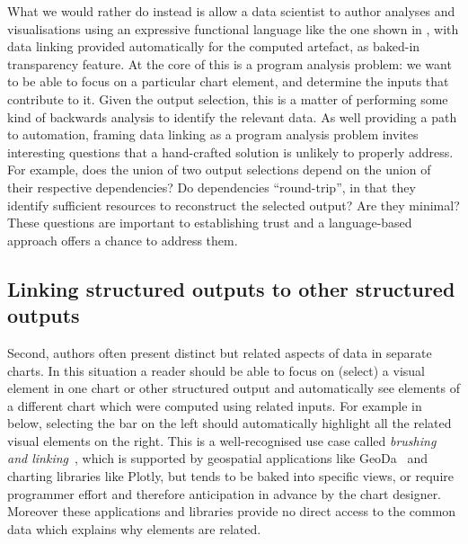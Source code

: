 What we would rather do instead is allow a data scientist to author analyses and visualisations using an expressive functional language like the one shown in , with data linking provided automatically for the computed artefact, as baked-in transparency feature. At the core of this is a program analysis problem: we want to be able to focus on a particular chart element, and determine the inputs that contribute to it. Given the output selection, this is a matter of performing some kind of backwards analysis to identify the relevant data. As well providing a path to automation, framing data linking as a program analysis problem invites interesting questions that a hand-crafted solution is unlikely to properly address. For example, does the union of two output selections depend on the union of their respective dependencies? Do dependencies ``round-trip'', in that they identify sufficient resources to reconstruct the selected output? Are they minimal? These questions are important to establishing trust and a language-based approach offers a chance to address them.

\subsection{Linking structured outputs to other structured outputs}
\label{sec:introduction:vis-linking}

Second, authors often present distinct but related aspects of data in separate charts. In this situation a reader should be able to focus on (select) a visual element in one chart or other structured output and automatically see elements of a different chart which were computed using related inputs. For example in  below, selecting the bar on the left should automatically highlight all the related visual elements on the right. This is a well-recognised use case called \emph{brushing and linking}~\cite{becker87}, which is supported by geospatial applications like GeoDa~\cite{anselin06} and charting libraries like Plotly, but tends to be baked into specific views, or require programmer effort and therefore anticipation in advance by the chart designer. Moreover these applications and libraries provide no direct access to the common data which explains why elements are related.

